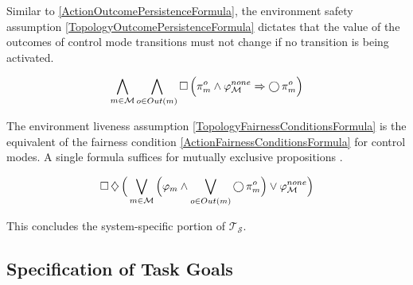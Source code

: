 Similar to \eqref{ActionOutcomePersistenceFormula}, the environment safety assumption \eqref{TopologyOutcomePersistenceFormula} dictates that the value of the outcomes of control mode transitions must not change if no transition is being activated.

\begin{equation}\label{TopologyOutcomePersistenceFormula}
	\bigwedge \limits_{m \in \mathcal{M}} \bigwedge \limits_{o \in Out(m)} \operatorname{\Box} \Big( \pi_m^o \wedge \varphi_\mathcal{M}^{none} \Rightarrow \operatorname{\bigcirc} \pi_m^o \Big)
\end{equation}

The environment liveness assumption \eqref{TopologyFairnessConditionsFormula} is the equivalent of the fairness condition \eqref{ActionFairnessConditionsFormula} for control modes.
A single formula suffices for mutually exclusive propositions \cite{Vasu2013ICRA}.


\begin{equation}\label{TopologyFairnessConditionsFormula}
	\operatorname{\Box} \operatorname{\diamondsuit} \Big( \bigvee \limits_{m \in \mathcal{M}} \Big( \varphi_m \wedge \bigvee \limits_{o \in Out(m)} \operatorname{\bigcirc} \pi_m^o \Big) \vee \varphi_\mathcal{M}^{none} \Big)
\end{equation}

This concludes the system-specific portion of $\mathcal{T_S}$.


\subsection{Specification of Task Goals}\label{S:ltl-goals}

